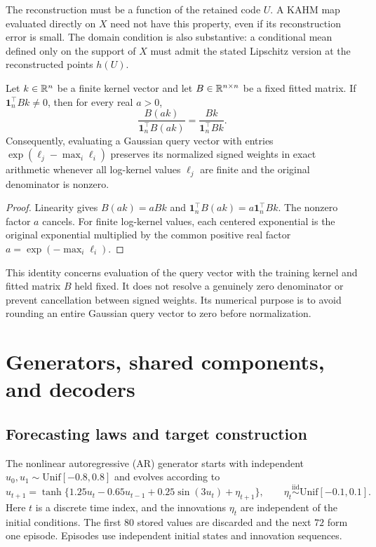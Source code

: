 The reconstruction must be a function of the retained code $U$. A KAHM
map evaluated directly on $X$ need not have this property, even if its
reconstruction error is small. The domain condition is also substantive:
a conditional mean defined only on the support of $X$ must admit the
stated Lipschitz version at the reconstructed points $h(U)$.

\begin{proposition}
\label{c:prop:inner-scaling}
Let $k\in\mathbb{R}^n$ be a finite kernel vector and let $B\in\mathbb{R}^{n\times n}$
be a fixed fitted matrix. If $\boldsymbol1_n^\top Bk\ne0$, then for
every real $a>0$,
\[
 \frac{B(ak)}{\boldsymbol1_n^\top B(ak)}
 =\frac{Bk}{\boldsymbol1_n^\top Bk}.
\]
Consequently, evaluating a Gaussian query vector with entries
$\exp(\ell_j-\max_i\ell_i)$ preserves its normalized signed weights
in exact arithmetic whenever all log-kernel values $\ell_j$ are finite
and the original denominator is nonzero.
\end{proposition}
\begin{proof}
Linearity gives $B(ak)=aBk$ and
$\boldsymbol1_n^\top B(ak)=a\boldsymbol1_n^\top Bk$. The nonzero
factor $a$ cancels. For finite log-kernel values, each centered
exponential is the original exponential multiplied by the common
positive real factor $a=\exp(-\max_i\ell_i)$.
\end{proof}

This identity concerns evaluation of the query vector with the training
kernel and fitted matrix $B$ held fixed. It does not resolve a genuinely
zero denominator or prevent cancellation between signed weights. Its
numerical purpose is to avoid rounding an entire Gaussian query vector
to zero before normalization.

\section{Generators, shared components, and decoders}\label{c:app:methods}

\subsection{Forecasting laws and target construction}

The nonlinear autoregressive (AR) generator starts with independent
$u_0,u_1\sim\mathrm{Unif}[-0.8,0.8]$ and evolves according to
\[
 u_{t+1}=\tanh\{1.25u_t-0.65u_{t-1}
                   +0.25\sin(3u_t)+\eta_{t+1}\},\qquad
 \eta_t\stackrel{\mathrm{iid}}\sim\mathrm{Unif}[-0.1,0.1].
\]
Here $t$ is a discrete time index, and the innovations $\eta_t$ are
independent of the initial conditions. The first $80$ stored values are
discarded and the next $72$ form one episode. Episodes use independent
initial states and innovation sequences.


